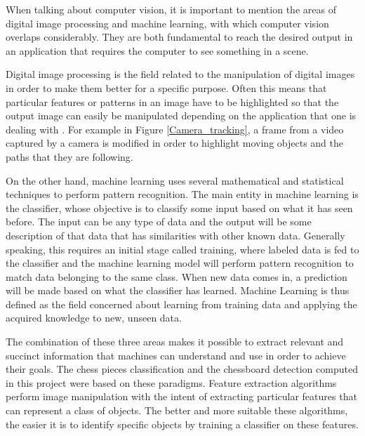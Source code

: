 \documentclass{l4proj}
\begin{document}
When talking about computer vision, it is important to mention the areas of digital image processing and machine learning, with which computer vision overlaps considerably. They are both fundamental to reach the desired output in an application that requires the computer to see something in a scene.

Digital image processing is the field related to the manipulation of digital images in order to make them better for a specific purpose. Often this means that particular features or patterns in an image have to be highlighted so that the output image can easily be manipulated depending on the application that one is dealing with \cite{DIPTartu}. For example in Figure \ref{Camera_tracking}, a frame from a video captured by a camera is modified in order to highlight moving objects and the paths that they are following. 

On the other hand, machine learning uses several mathematical and statistical techniques to perform pattern recognition. The main entity in machine learning is the classifier, whose objective is to classify some input based on what it has seen before. The input can be any type of data and the output will be some description of that data that has similarities with other known data. Generally speaking, this requires an initial stage called training, where labeled data is fed to the classifier and the machine learning model will perform pattern recognition to match data belonging to the same class. When new data comes in, a prediction will be made based on what the classifier has learned.  Machine Learning is thus defined as the field concerned about learning from training data and applying the acquired knowledge to new, unseen data.

The combination of these three areas makes it possible to extract relevant and succinct information that machines can understand and use in order to achieve their goals. The chess pieces classification and the chessboard detection computed in this project were based on these paradigms. Feature extraction algorithms perform image manipulation with the intent of extracting particular features that can represent a class of objects. The better and more suitable these algorithms, the easier it is to identify specific objects by training a classifier on these features.
\end{document}
